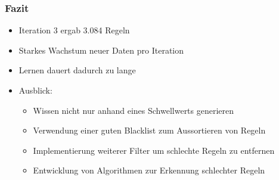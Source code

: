 \begin{frame}
  \frametitle{Fazit}

  \begin{itemize}
  \item Iteration 3 ergab 3.084 Regeln
  \item Starkes Wachstum neuer Daten pro Iteration
  \item Lernen dauert dadurch zu lange
  \item Ausblick:
    \begin{itemize}
    \item Wissen nicht nur anhand eines Schwellwerts generieren
    \item Verwendung einer guten Blacklist zum Aussortieren von Regeln
    \item Implementierung weiterer Filter um schlechte Regeln zu entfernen
    \item Entwicklung von Algorithmen zur Erkennung schlechter Regeln
    \end{itemize}
  \end{itemize}
\end{frame}
